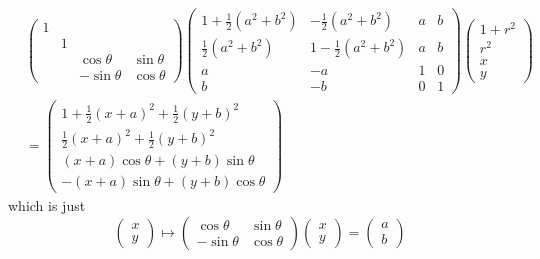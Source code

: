 \begin{equation}
    \begin{split}
    &\begin{pmatrix}
       1 &   &  & \\
         & 1 &  &  \\
         &   & \cos\theta & \sin\theta \\
         &   & -\sin\theta & \cos\theta
    \end{pmatrix}
    \begin{pmatrix}1 + \frac{1}{2}(a^2+b^2) & -\frac{1}{2}(a^2+b^2)  & a & b\\
        \frac{1}{2}(a^2+b^2) & 1-\frac{1}{2}(a^2+b^2)  & a & b \\
       a& -a  & 1 & 0 \\
       b & -b& 0 & 1
    \end{pmatrix}
    \begin{pmatrix}
        1 + r^2\\
        r^2\\
        x\\
        y
    \end{pmatrix}\\
    &=\begin{pmatrix}1+\frac{1}{2}(x+a)^2 + \frac{1}{2}(y+b)^2\\
     \frac{1}{2}(x+a)^2 + \frac{1}{2}(y+b)^2\\
     (x+a)\cos\theta + (y+b)\sin\theta\\
     -(x+a)\sin\theta + (y+b)\cos\theta
    \end{pmatrix}
    \end{split}
\end{equation}
which is just 
\begin{equation}
    \begin{pmatrix}
        x\\y
    \end{pmatrix} \mapsto \begin{pmatrix}
        \cos\theta & \sin\theta\\
        -\sin\theta& \cos\theta
    \end{pmatrix}\begin{pmatrix}
        x\\y
    \end{pmatrix} = \begin{pmatrix}
        a\\b
    \end{pmatrix}
\end{equation}
